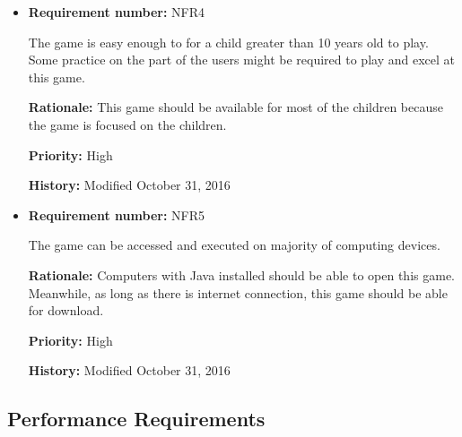 \documentclass[12pt,letterpaper]{article}
\begin{document}
\begin{reqbox}
	\begin{itemize}
 	
 	\item \textbf{Requirement number: }NFR4
 	
   	The game is easy enough to for a child greater than 10 years old to play. Some practice on the part of the users might be required to play and excel at this game.

		\textbf{Rationale: } This game should be available for most of the children because the game is focused on the children.

		\textbf{Priority: }High

		\textbf{History: }Modified October 31, 2016

	\end{itemize}
\end{reqbox}

\begin{reqbox}
	\begin{itemize}

 	\subsubsection{Accessibility Requirements}
 	
 	\item \textbf{Requirement number: }NFR5
 	
	The game can be accessed and executed on majority of computing devices. 

		\textbf{Rationale: } Computers with Java installed should be able to open this game. Meanwhile, as long as there is internet connection, this game should be able for download.

		\textbf{Priority: }High

		\textbf{History: }Modified October 31, 2016
	

	\end{itemize}
\end{reqbox}


\subsection{Performance Requirements}
\end{document}
